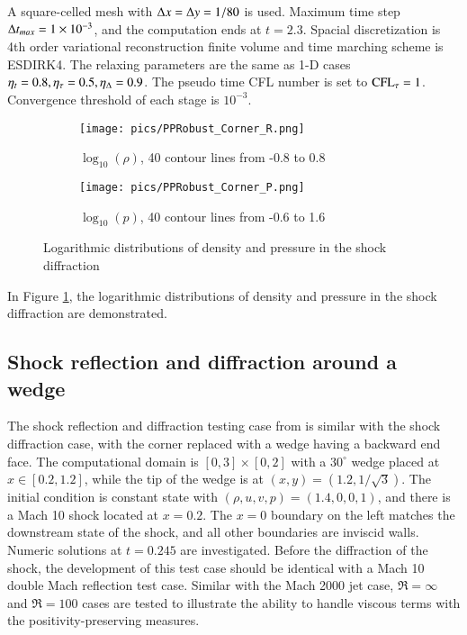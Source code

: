 A square-celled mesh with $\mathrm\Delta x = \mathrm\Delta y = 1/80$ is used. 
Maximum time step $\mathrm\Delta t_{max}=1\times 10^{-3}$, and the computation ends at 
$t=2.3$. 
Spacial discretization is 4th order variational reconstruction finite volume
and time marching scheme is ESDIRK4. 
The relaxing parameters are the same as 
1-D cases $\eta_t= 0.8, \eta_\tau=0.5, \eta_\mathrm\Delta=0.9$.
The pseudo time CFL number is set to $\text{CFL}_\tau = 1$. 
Convergence threshold of each stage is $10^{-3}$. 

\begin{figure}[htbp]
    \centering
    \begin{subfigure}{0.5\textwidth}
        \texttt{[image: pics/PPRobust\_Corner\_R.png]}
        \caption[]{$\log_{10}(\rho)$, 40 contour lines from -0.8 to 0.8}
    \end{subfigure}\hfill
    \begin{subfigure}{0.5\textwidth}
        \texttt{[image: pics/PPRobust\_Corner\_P.png]}
        \caption[]{$\log_{10}(p)$, 40 contour lines from -0.6 to 1.6}
    \end{subfigure}
    \caption{Logarithmic distributions of density and pressure in the shock diffraction}
    \label{fig:Corner}
\end{figure}

In Figure \ref{fig:Corner}, 
the logarithmic distributions of density and pressure in the shock diffraction
are demonstrated. 


\subsection{Shock reflection and diffraction around a wedge}

The shock reflection and diffraction testing case from \cite{zhang2017positivity}
is similar with the shock diffraction case, with the 
corner replaced with a wedge having a backward end face.
The computational domain is $[0,3]\times[0,2]$ with 
a $30^\circ$ wedge placed at $x\in[0.2,1.2]$, while the 
tip of the wedge is at $(x,y) = (1.2, 1/\sqrt{3})$. 
The initial condition is constant state with $(\rho, u, v, p) = (1.4,0,0,1)$, 
and there is a Mach 10 shock located at $x = 0.2$. The $x=0$ boundary on 
the left matches the downstream state of the shock, and all other boundaries 
are inviscid walls. Numeric solutions at $t=0.245$ are investigated. 
Before the diffraction of the shock, the development
of this test case should be identical with a Mach 10 double Mach reflection \cite{woodward1984dmr}
test case. Similar with the Mach 2000 jet case, $\Re=\infty$ and $\Re=100$ cases 
are tested to illustrate the ability to handle viscous terms 
with the positivity-preserving measures.

